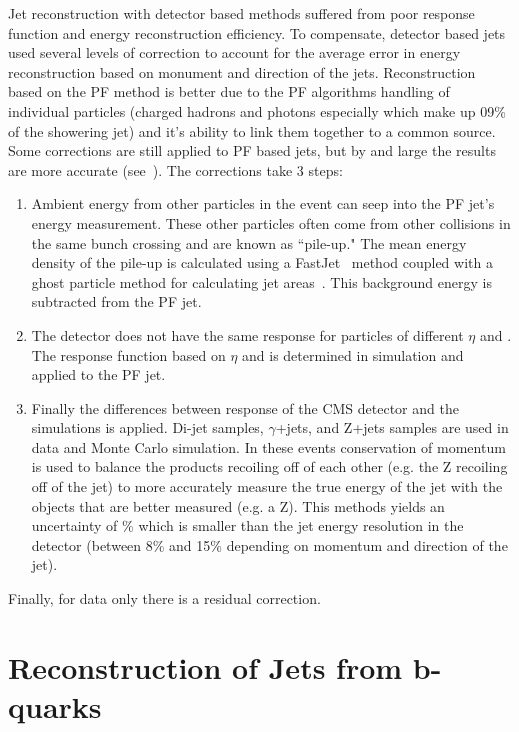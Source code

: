 	Jet reconstruction with detector based methods suffered from poor response function and energy reconstruction efficiency. To compensate, detector based jets used several levels of correction to account for the average error in energy reconstruction based on monument and direction of the jets. Reconstruction based on the PF method is better due to the PF algorithms handling of individual particles (charged hadrons and photons especially which make up 09\% of the showering jet) and it's ability to link them together to a common source. Some corrections are still applied to PF based jets, but by and large the results are more accurate (see~\cite{cmsjetcal}). The corrections take 3 steps:
	\begin{enumerate}
	\item Ambient energy from other particles in the event can seep into the PF jet's energy measurement. These other particles often come from other collisions in the same bunch crossing and are known as ``pile-up." The mean energy density of the pile-up is calculated using a FastJet~\cite{fastjet} method coupled with a ghost particle method for calculating jet areas~\cite{jetarea}. This background energy is subtracted from the PF jet.\\
	\item The detector does not have the same response for particles of different $\eta$ and \pt. The response function based on $\eta$ and \pt is determined in simulation and applied to the PF jet.\\
	\item Finally the differences between response of the CMS detector and the simulations is applied. Di-jet samples, $\gamma$+jets, and Z+jets samples are used in data and Monte Carlo simulation. In these events conservation of momentum is used to balance the products recoiling off of each other (e.g. the Z recoiling off of the jet) to more accurately measure the true energy of the jet with the objects that are better measured (e.g. a Z). This methods yields an uncertainty of \% which is smaller than the jet energy resolution in the detector (between 8\% and 15\% depending on momentum and direction of the jet).\\
	\end{enumerate}
	
	Finally, for data only there is a residual correction.\\
	
	
	
	
	\section{Reconstruction of Jets from b-quarks}
	
